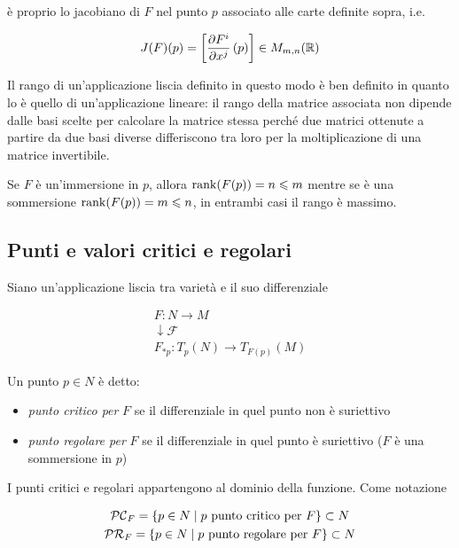 è proprio lo jacobiano di $ F $ nel punto $ p $ associato alle carte definite sopra, i.e.

\begin{equation}
	J(F)(p) = \left[ \pdv{F^{i}}{x^{j}} \, (p) \right] \in M_{m,n}(\mathbb{R})
\end{equation}

Il rango di un'applicazione liscia definito in questo modo è ben definito in quanto lo è quello di un'applicazione lineare: il rango della matrice associata non dipende dalle basi scelte per calcolare la matrice stessa perché due matrici ottenute a partire da due basi diverse differiscono tra loro per la moltiplicazione di una matrice invertibile.

\begin{remark}
	Se $ F $ è un'immersione in $ p $, allora $ \rank(F(p)) = n \leqslant m $ mentre se è una sommersione $ \rank(F(p)) = m \leqslant n $, in entrambi casi il rango è massimo.
\end{remark}

\subsection{Punti e valori critici e regolari}

Siano un'applicazione liscia tra varietà e il suo differenziale

\begin{gather}
	F : N \to M \\
	\downarrow \mathcal{F} \nonumber \\
	F_{*p} : T_{p}(N) \to T_{F(p)}(M)
\end{gather}

Un punto $ p \in N $ è detto:

\begin{itemize}
	\item \textit{punto critico per} $ F $ se il differenziale in quel punto non è suriettivo
	
	\item \textit{punto regolare per} $ F $ se il differenziale in quel punto è suriettivo ($ F $ è una sommersione in $ p $)
\end{itemize}

I punti critici e regolari appartengono al dominio della funzione. Come notazione

\begin{gather}
	\mathcal{PC}_{F} = \{ p \in N \mid p \text{ punto critico per } F \} \subset N \\
	\mathcal{PR}_{F} = \{ p \in N \mid p \text{ punto regolare per } F \} \subset N
\end{gather}

